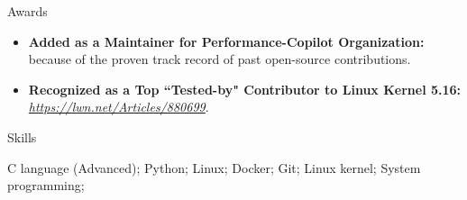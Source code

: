 \documentclass[]{Sohaib-Mohamed}
\begin{document}
\begin{cvsection}{Awards}
   \begin{cvsubsection}{}{}{}
      \begin{itemize}
         \item \textbf{Added as a Maintainer for Performance-Copilot Organization:} because of the proven track record of past open-source contributions.
         \item \textbf{Recognized as a Top ``Tested-by" Contributor to Linux Kernel 5.16:} \href{https://lwn.net/Articles/880699/}{\textit{https://lwn.net/Articles/880699}}.
      \end{itemize}
   \end{cvsubsection}
\end{cvsection}


\begin{cvsection}{Skills}
   \begin{cvsubsection}{}{}{}
      C language (Advanced); Python; Linux; Docker; Git; Linux kernel; System programming;
   \end{cvsubsection}
\end{cvsection}
\end{document}
